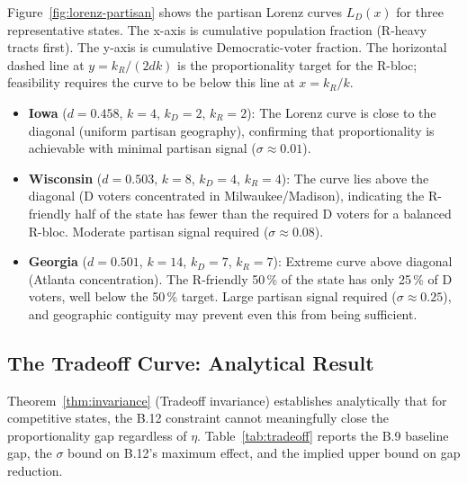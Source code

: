 Figure~\ref{fig:lorenz-partisan} shows the partisan Lorenz curves $L_D(x)$ for
three representative states.
The x-axis is cumulative population fraction (R-heavy tracts first).
The y-axis is cumulative Democratic-voter fraction.
The horizontal dashed line at $y = k_R/(2dk)$ is the proportionality target
for the R-bloc; feasibility requires the curve to be below this line at $x = k_R/k$.

\begin{itemize}
\item \textbf{Iowa} ($d = 0.458$, $k=4$, $k_D=2$, $k_R=2$): The Lorenz curve
  is close to the diagonal (uniform partisan geography), confirming that
  proportionality is achievable with minimal partisan signal ($\sigma \approx 0.01$).

\item \textbf{Wisconsin} ($d = 0.503$, $k=8$, $k_D=4$, $k_R=4$): The curve
  lies above the diagonal (D voters concentrated in Milwaukee/Madison),
  indicating the R-friendly half of the state has fewer than the required
  D voters for a balanced R-bloc. Moderate partisan signal required ($\sigma \approx 0.08$).

\item \textbf{Georgia} ($d = 0.501$, $k=14$, $k_D=7$, $k_R=7$): Extreme
  curve above diagonal (Atlanta concentration). The R-friendly 50\,\% of the
  state has only 25\,\% of D voters, well below the 50\,\% target. Large
  partisan signal required ($\sigma \approx 0.25$), and geographic contiguity
  may prevent even this from being sufficient.
\end{itemize}

\subsection{The Tradeoff Curve: Analytical Result}

Theorem~\ref{thm:invariance} (Tradeoff invariance) establishes analytically that
for competitive states, the B.12 constraint cannot meaningfully close the
proportionality gap regardless of $\eta$.
Table~\ref{tab:tradeoff} reports the B.9 baseline gap, the $\sigma$ bound
on B.12's maximum effect, and the implied upper bound on gap reduction.

